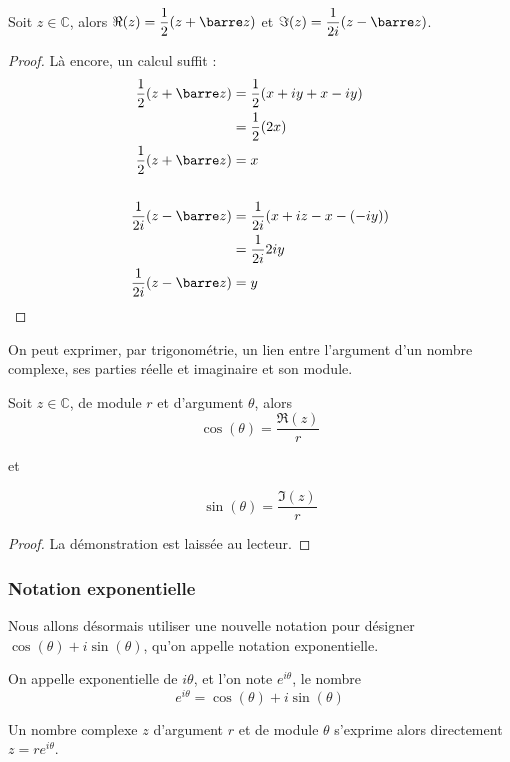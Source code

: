 \begin{prop}
    Soit $z\in\mathbb C$, alors $\Re(z)=\dfrac{1}{2}(z+\barre z)$ et $\Im(z)=\dfrac{1}{2i}(z-\barre z)$.
\end{prop}
\begin{proof}
    Là encore, un calcul suffit :
    \begin{align*}
        \dfrac{1}{2}(z+\barre z)&= \dfrac{1}{2}(x+iy+x-iy)\\
        &= \dfrac{1}{2}(2x)\\
        \dfrac{1}{2}(z+\barre z) &= x\\
        \\
        \dfrac{1}{2i}(z-\barre z) &= \dfrac{1}{2i}(x+iz-x-(-iy))\\
        &= \dfrac{1}{2i}2iy\\
        \dfrac{1}{2i}(z-\barre z) &= y
    \end{align*}
\end{proof}

On peut exprimer, par trigonométrie, un lien entre l'argument d'un nombre complexe, ses parties réelle et imaginaire et son module.

\begin{prop}
    Soit $z\in\mathbb C$, de module $r$ et d'argument $\theta$, alors $$\cos(\theta)=\dfrac{\Re(z)}{r}$$ \begin{center} et \end{center} $$\sin(\theta)=\dfrac{\Im(z)}{r}$$
\end{prop}
\begin{proof}
    La démonstration est laissée au lecteur.
\end{proof}

\subsubsection{Notation exponentielle}

Nous allons désormais utiliser une nouvelle notation pour désigner $\cos(\theta)+i\sin(\theta)$, qu'on appelle notation exponentielle.

\begin{defi}
    On appelle exponentielle de $i\theta$, et l'on note $e^{i\theta}$, le nombre $$e^{i\theta}=\cos(\theta)+i\sin(\theta)$$
\end{defi}

\begin{rmk}\label{remarquent}
    Un nombre complexe $z$ d'argument $r$ et de module $\theta$ s'exprime alors directement $z = re^{i\theta}$.
\end{rmk}

